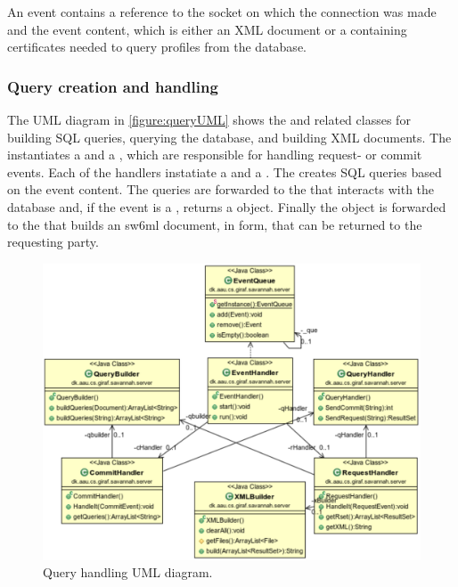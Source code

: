 An event contains a reference to the socket on which the connection was made and the event content, which is either an XML document or a  containing certificates
needed to query profiles from the database.

\subsubsection{Query creation and handling}

The UML diagram in \autoref{figure:queryUML} shows the  and related classes for building SQL queries, querying the database, and building XML documents.
The  instantiates a  and a , which are responsible for handling request- or commit events.
Each of the handlers instatiate a  and a . The  creates SQL queries based on the event content. The queries are forwarded to the 
that interacts with the database and, if the event is a , returns a  object. Finally the  object is forwarded to the  that builds an sw6ml document,
in  form, that can be returned to the requesting party. 
\begin{figure}[H]
 \centering
  \includegraphics[scale=0.65]{images/queryhandling}
  \caption{Query handling UML diagram.}
  \label{figure:queryUML}
\end{figure}

